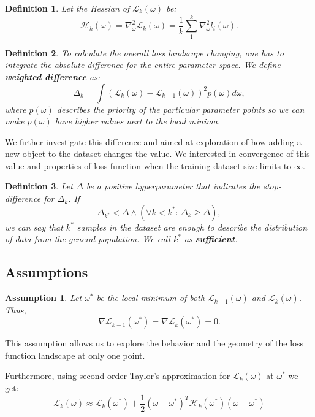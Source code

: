 \documentclass{article}
\newtheorem{definition}{Definition}
\newtheorem{assumption}{Assumption}
\begin{document}
\begin{definition}
  Let the Hessian of $\mathcal{L}_k(\omega)$ be:
  $$\mathcal{H}_k(\omega) = \nabla^2_{\omega}\mathcal{L}_k(\omega) = \frac1k \sum\limits_1^k \nabla^2_{\omega} l_i(\omega).$$
\end{definition}

\begin{definition}
  To calculate the overall loss landscape changing, one has to integrate the absolute difference for the entire parameter space.
  We define \textbf{weighted difference} as:
  $$\Delta_{k} = \int \left( \mathcal{L}_{k}(\omega) - \mathcal{L}_{k-1}(\omega) \right)^2 p(\omega) d\omega,$$
  where $p(\omega)$ describes the priority of the particular parameter points so we can make $p(\omega)$ have higher values
  next to the local minima.
\end{definition}

We firther investigate this difference and aimed at exploration of how adding a new object to the dataset changes the value.
We interested in convergence of this value and properties of loss function when the training dataset size limits to $\infty$.


\begin{definition}
  Let $\Delta$ be a positive hyperparameter that indicates the stop-difference for $\Delta_k$. If
  $$\Delta_{k^*} < \Delta \wedge \left( \forall k < k^*: \, \Delta_k \geq \Delta \right),$$
  we can say that $k^*$ samples in the dataset are enough to describe the distribution of data from the general population.
  We call $k^*$ as \textbf{sufficient}.
\end{definition}

\subsection{Assumptions}

\begin{assumption}
  Let $\omega^*$ be the local minimum of both $\mathcal{L}_{k-1}(\omega)$ and $\mathcal{L}_{k}(\omega)$.
  Thus, $$\nabla \mathcal{L}_{k-1}(\omega^*) = \nabla \mathcal{L}_{k}(\omega^*) = 0.$$
\end{assumption}

This assumption allows us to explore the behavior and the geometry of the loss function landscape at only one point.

Furthermore, using second-order Taylor's approximation for $\mathcal{L}_{k}(\omega)$ at $\omega^*$ we get:
$$\mathcal{L}_{k}(\omega) \approx \mathcal{L}_{k}(\omega^*) + \frac12 (\omega - \omega^*)^T \mathcal{H}_k(\omega^*)
  (\omega - \omega^*)$$
\end{document}
